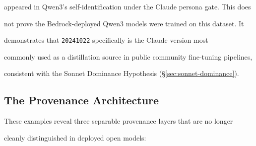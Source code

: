 appeared in Qwen3's self-identification under the Claude persona gate. This does





not prove the Bedrock-deployed Qwen3 models were trained on this dataset. It





demonstrates that \texttt{20241022} specifically is the Claude version most





commonly used as a distillation source in public community fine-tuning pipelines,





consistent with the Sonnet Dominance Hypothesis (\S\ref{sec:sonnet-dominance}).











\subsection{The Provenance Architecture}











These examples reveal three separable provenance layers that are no longer





cleanly distinguished in deployed open models:











